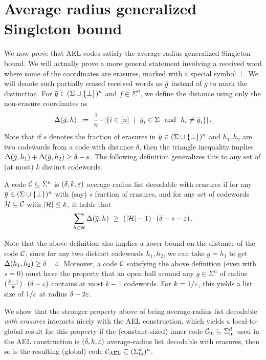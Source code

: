 \section{Average radius generalized Singleton bound}\label{sec:avg-singleton}
%
We now prove that AEL codes satisfy the average-radius generalized Singleton bound. 
%
We will actually prove a more general statement involving a received word where some of the coordinates are erasures, marked with a special symbol $\bot$. We will denote such partially erased received words as $\overline{g}$ instead of $g$ to mark the distinction.
%
For $\overline{g} \in (\Sigma \cup \{\bot\})^n$ and $f \in \Sigma^n$, we define the distance using only the non-erasure coordinates as
\[
\Delta(\overline{g},h) ~:=~ 
\frac{1}{n} \cdot \lvert\left\{i \in [n] ~\mid~ \overline{g}_i \in \Sigma ~~\text{and}~~ h_i \neq \overline{g}_i\right\}\rvert \,.
\]
%
Note that if $s$ denotes the fraction of erasures in $\overline{g} \in (\Sigma \cup \{\bot\})^n$ and $h_1, h_2$ are two codewords from a code with distance $\delta$, then the triangle inequality implies $\Delta(\overline{g},h_1)+\Delta(\overline{g},h_2) \geq \delta - s$. 
%
The following definition generalizes this to any set of (at most) $k$ distinct codewords.

\begin{definition}\label{def:gen_singleton}
A code ${\mathcal C} \subseteq \Sigma^n$ is $(\delta, k,\varepsilon)$ { average-radius
  list decodable with erasures} if for any $\overline{g} \in (\Sigma \cup \{\bot\})^n$ with (say) $s$ fraction of erasures, and for any set of codewords ${\mathcal H} \subseteq {\mathcal C}$ with $|{\mathcal H}| \leq k$, it holds that 
\[
\sum_{h \in {\mathcal H}} \Delta(\overline{g},h) ~\geq~ (\lvert{\mathcal H}\rvert - 1) \cdot (\delta - s - \varepsilon) \,.
\]
\end{definition}
%
Note that the above definition also implies a lower bound on the distance of the code ${\mathcal C}$, since for
any two distinct codewords $h_1, h_2$, we can take $g = h_1$ to get $\Delta(h_1, h_2) \geq \delta - \varepsilon$.
%
Moreover, a code ${\mathcal C}$ satisfying the above definition (even with $s=0$) must have the property that an open ball around any $g \in \Sigma^n$ of radius $(\frac{k-1}{k}) \cdot (\delta - \varepsilon)$ contains at most $k-1$ codewords. For $k = 1/\varepsilon$, this yields a list size of $1/\varepsilon$ at radius $\delta - 2\varepsilon$. 

We show that the stronger property above of being average-radius list decodable \emph{with erasures}
interacts nicely with the AEL construction, which yields a local-to-global result for this property
\ie if the (constant-sized) inner code ${\mathcal C}_{\mathrm{in}} \subseteq \Sigma_{\mathrm{in}}^d$ used in the AEL
construction is $(\delta, k,\varepsilon)$ average-radius list decodable with erasures, then so is the resulting (global) code ${ {\mathcal C}_{\mathrm{AEL}} } \subseteq (\Sigma_{\mathrm{in}}^d)^n$.
%

